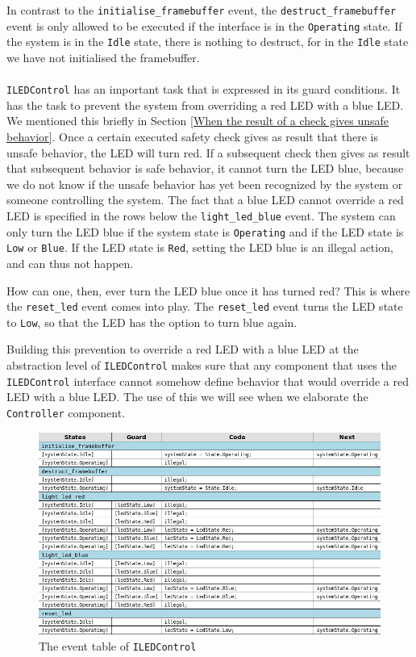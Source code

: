 \documentclass[12pt]{scrreprt}
\begin{document}
In contrast to the \texttt{initialise\_framebuffer} event, the \texttt{destruct\_framebuffer} event is only allowed to be executed if the interface is in the \texttt{Operating} state. If the system is in the \texttt{Idle} state, there is nothing to destruct, for in the \texttt{Idle} state we have not initialised the framebuffer.
\\\\
\texttt{ILEDControl} has an important task that is expressed in its guard conditions. It has the task to prevent the system from overriding a red LED with a blue LED. We mentioned this briefly in Section \ref{When the result of a check gives unsafe behavior}. Once a certain executed safety check gives as result that there is unsafe behavior, the LED will turn red. If a subsequent check then gives as result that subsequent behavior is safe behavior, it cannot turn the LED blue, because we do not know if the unsafe behavior has yet been recognized by the system or someone controlling the system. The fact that a blue LED cannot override a red LED is specified in the rows below the \texttt{light\_led\_blue} event. The system can only turn the LED blue if the system state is \texttt{Operating} and if the LED state is \texttt{Low} or \texttt{Blue}. If the LED state is \texttt{Red}, setting the LED blue is an illegal action, and can thus not happen.
\par
How can one, then, ever turn the LED blue once it has turned red? This is where the \texttt{reset\_led} event comes into play. The \texttt{reset\_led} event turns the LED state to \texttt{Low}, so that the LED has the option to turn blue again.
\par
Building this prevention to override a red LED with a blue LED at the abstraction level of \texttt{ILEDControl} makes sure that any component that uses the \texttt{ILEDControl} interface cannot somehow define behavior that would override a red LED with a blue LED. The use of this we will see when we elaborate the \texttt{Controller} component.


\begin{figure}[H]
    \centering
    \includegraphics[width=\textwidth]{Figures/results/modelling_figures/ILEDControl/ILEDControl_event_table.png}
    \caption{The event table of \texttt{ILEDControl}}
    \label{fig:ILEDControl_event_table}
\end{figure}
\end{document}
